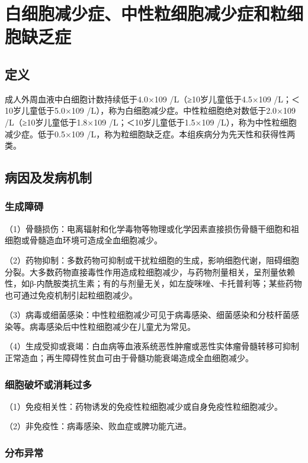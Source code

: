 \section{白细胞减少症、中性粒细胞减少症和粒细胞缺乏症}

\subsection{定义}

成人外周血液中白细胞计数持续低于4.0×10{9} /L（≥10岁儿童低于4.5×10{9}
/L；＜10岁儿童低于5.0×10{9}
/L），称为白细胞减少症。中性粒细胞绝对数低于2.0×10{9}
/L（≥10岁儿童低于1.8×10{9} /L；＜10岁儿童低于1.5×10{9}
/L），称为中性粒细胞减少症。低于0.5×10{9}
/L，称为粒细胞缺乏症。本组疾病分为先天性和获得性两类。

\subsection{病因及发病机制}

\subsubsection{生成障碍}

（1）骨髓损伤：电离辐射和化学毒物等物理或化学因素直接损伤骨髓干细胞和祖细胞或骨髓造血环境可造成全血细胞减少。

（2）药物抑制：多数药物可抑制或干扰粒细胞的生成，影响细胞代谢，阻碍细胞分裂。大多数药物直接毒性作用造成粒细胞减少，与药物剂量相关，呈剂量依赖性，如β-内酰胺类抗生素；有的与剂量无关，如左旋咪唑、卡托普利等；某些药物也可通过免疫机制引起粒细胞减少。

（3）病毒或细菌感染：中性粒细胞减少可见于病毒感染、细菌感染和分枝杆菌感染等。病毒感染后中性粒细胞减少在儿童尤为常见。

（4）生成受抑或衰竭：白血病等血液系统恶性肿瘤或恶性实体瘤骨髓转移可抑制正常造血；再生障碍性贫血可由于骨髓功能衰竭造成全血细胞减少。

\subsubsection{细胞破坏或消耗过多}

（1）免疫相关性：药物诱发的免疫性粒细胞减少或自身免疫性粒细胞减少。

（2）非免疫性：病毒感染、败血症或脾功能亢进。

\subsubsection{分布异常}

